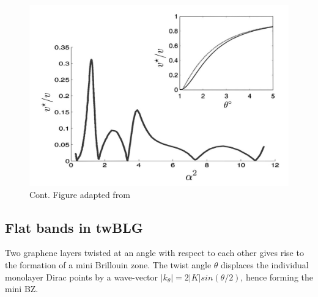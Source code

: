 \begin{figure}[H]
	\centering
	\includegraphics[width=\textwidth]{figures/contmodelvel.jpg}
	\caption{Cont. Figure adapted from \cite{Bistritzer12233}}
	\label{fig:contmodelvel}
\end{figure}

\subsection{Flat bands in twBLG}
Two graphene layers twisted at an angle with respect to each other gives rise to the formation of a mini Brillouin zone. The twist angle $\theta$ displaces the individual monolayer Dirac points by a wave-vector $|k_\theta|=2|K|sin(\theta/2)$, hence forming the mini BZ.

